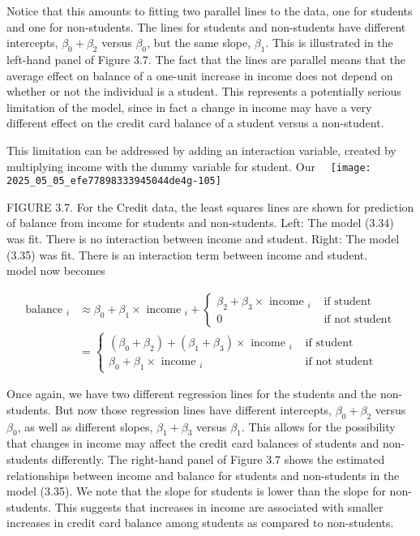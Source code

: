 \documentclass[10pt]{article}
\begin{document}
Notice that this amounts to fitting two parallel lines to the data, one for students and one for non-students. The lines for students and non-students have different intercepts, $\beta_{0}+\beta_{2}$ versus $\beta_{0}$, but the same slope, $\beta_{1}$. This is illustrated in the left-hand panel of Figure 3.7. The fact that the lines are parallel means that the average effect on balance of a one-unit increase in income does not depend on whether or not the individual is a student. This represents a potentially serious limitation of the model, since in fact a change in income may have a very different effect on the credit card balance of a student versus a non-student.

This limitation can be addressed by adding an interaction variable, created by multiplying income with the dummy variable for student. Our\
\
\texttt{[image: 2025\_05\_05\_efe77898333945044de4g-105]}

FIGURE 3.7. For the Credit data, the least squares lines are shown for prediction of balance from income for students and non-students. Left: The model (3.34) was fit. There is no interaction between income and student. Right: The model (3.35) was fit. There is an interaction term between income and student.\\
model now becomes


\begin{align*}
\text { balance }_{i} & \approx \beta_{0}+\beta_{1} \times \text { income }_{i}+ \begin{cases}\beta_{2}+\beta_{3} \times \text { income }_{i} & \text { if student } \\
0 & \text { if not student }\end{cases} \\
& = \begin{cases}\left(\beta_{0}+\beta_{2}\right)+\left(\beta_{1}+\beta_{3}\right) \times \text { income }_{i} & \text { if student } \\
\beta_{0}+\beta_{1} \times \text { income }_{i} & \text { if not student }\end{cases} \tag{3.35}
\end{align*}


Once again, we have two different regression lines for the students and the non-students. But now those regression lines have different intercepts, $\beta_{0}+\beta_{2}$ versus $\beta_{0}$, as well as different slopes, $\beta_{1}+\beta_{3}$ versus $\beta_{1}$. This allows for the possibility that changes in income may affect the credit card balances of students and non-students differently. The right-hand panel of Figure 3.7 shows the estimated relationships between income and balance for students and non-students in the model (3.35). We note that the slope for students is lower than the slope for non-students. This suggests that increases in income are associated with smaller increases in credit card balance among students as compared to non-students.
\end{document}
